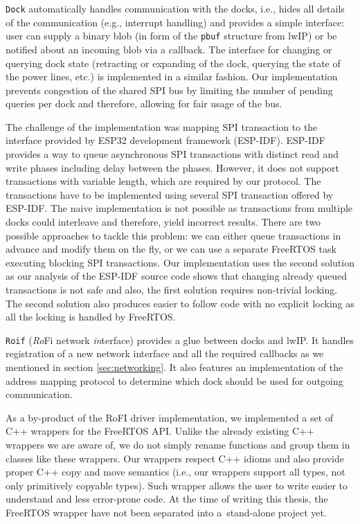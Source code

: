 \texttt{Dock} automatically handles communication with the docks, i.e., hides
all details of the communication (e.g., interrupt handling) and provides a
simple interface: user can supply a binary blob (in form of the \texttt{pbuf}
structure from lwIP) or be notified about an incoming blob via a callback. The
interface for changing or querying dock state (retracting or expanding of the
dock, querying the state of the power lines, etc.) is implemented in a similar
fashion. Our implementation prevents congestion of the shared SPI bus by
limiting the number of pending queries per dock and therefore, allowing for fair
usage of the bus.

The challenge of the implementation was mapping SPI transaction to the interface
provided by ESP32 development framework (ESP-IDF). ESP-IDF provides a way to
queue asynchronous SPI transactions with distinct read and write phases
including delay between the phases. However, it does not support transactions
with variable length, which are required by our protocol. The transactions have
to be implemented using several SPI transaction offered by ESP-IDF. The naive
implementation is not possible as transactions from multiple docks could
interleave and therefore, yield incorrect results. There are two possible
approaches to tackle this problem: we can either queue transactions in advance
and modify them on the fly, or we can use a separate FreeRTOS task executing
blocking SPI transactions. Our implementation uses the second solution as our
analysis of the ESP-IDF source code shows that changing already queued
transactions is not safe and also, the first solution requires non-trivial
locking. The second solution also produces easier to follow code with no
explicit locking as all the locking is handled by FreeRTOS.

\texttt{Roif} (\emph{Ro}Fi network \emph{in}terface) provides a glue between
docks and lwIP. It handles registration of a new network interface and all the
required callbacks as we mentioned in section \ref{sec:networking}. It also
features an implementation of the address mapping protocol to determine which
dock should be used for outgoing communication.

As a by-product of the RoFI driver implementation, we implemented a set of C++
wrappers for the FreeRTOS API. Unlike the already existing C++ wrappers we are
aware of, we do not simply rename functions and group them in classes like these
wrappers. Our wrappers respect C++ idioms and also provide proper C++ copy and
move semantics (i.e., our wrappers support all types, not only primitively
copyable types). Such wrapper allows the user to write easier to understand and
less error-prone code. At the time of writing this thesis, the FreeRTOS wrapper
have not been separated into a~stand-alone project yet.

